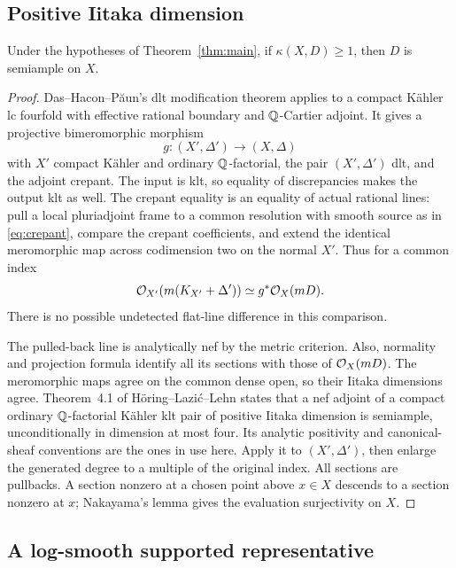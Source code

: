 \subsection{Positive Iitaka dimension}

\begin{proposition}\label{prop:positive-kappa}
Under the hypotheses of Theorem~\ref{thm:main}, if \(\kappa(X,D)\geq1\),
then \(D\) is semiample on \(X\).
\end{proposition}
\begin{proof}
Das--Hacon--P\u{a}un's dlt modification theorem
\cite[Theorem~6.1]{DasHaconPaun2024} applies to a compact K\"ahler lc
fourfold with effective rational boundary and \(\mathbb Q\)-Cartier adjoint.
It gives a projective bimeromorphic morphism
\[
 g:(X',\Delta')\longrightarrow(X,\Delta)
\]
with \(X'\) compact K\"ahler and ordinary \(\mathbb Q\)-factorial, the pair
\((X',\Delta')\) dlt, and the adjoint crepant.  The input is klt, so equality
of discrepancies makes the output klt as well.  The crepant equality is
an equality of actual rational lines: pull a local pluriadjoint frame to
a common resolution with smooth source as in \eqref{eq:crepant}, compare the crepant
coefficients, and extend the identical meromorphic map across codimension
two on the normal \(X'\).  Thus for a common index
\[
 \mathcal O_{X'}(m(K_{X'}+\Delta'))\simeq g^*\mathcal O_X(mD).
\]
There is no possible undetected flat-line difference in this comparison.

The pulled-back line is analytically nef by the metric criterion.  Also,
normality and projection formula identify all its sections with those of
\(\mathcal O_X(mD)\).  The meromorphic maps agree on the common dense open, so
their Iitaka dimensions agree.  Theorem~4.1 of
H\"oring--Lazi\'c--Lehn \cite{HoeringLazicLehn2025} states that a nef
adjoint of a compact ordinary \(\mathbb Q\)-factorial K\"ahler klt pair of
positive Iitaka dimension is semiample, unconditionally in dimension at
most four.  Its analytic positivity and canonical-sheaf conventions are
the ones in use here.  Apply it to \((X',\Delta')\), then enlarge the
generated degree to a multiple of the original index.  All sections are
pullbacks.  A section nonzero at a chosen point above \(x\in X\) descends
to a section nonzero at \(x\); Nakayama's lemma gives the evaluation
surjectivity on \(X\).
\end{proof}

\subsection{A log-smooth supported representative}

